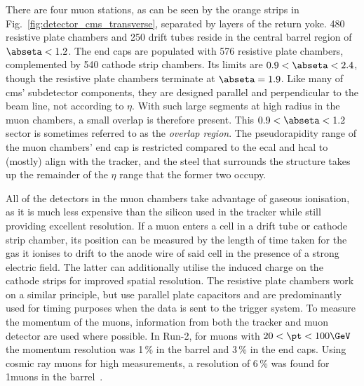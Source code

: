 There are four muon stations, as can be seen by the orange strips in Fig.~\ref{fig:detector_cms_transverse}, separated by layers of the return yoke. 480 resistive plate chambers and 250 drift tubes reside in the central barrel region of $\abseta < \text{1.2}$. The end caps are populated with 576 resistive plate chambers, complemented by 540 cathode strip chambers. Its limits are $\text{0.9} < \abseta < \text{2.4}$, though the resistive plate chambers terminate at $\abseta = \text{1.9}$. Like many of \acrshort{cms}' subdetector components, they are designed parallel and perpendicular to the beam line, not according to $\eta$. With such large segments at high radius in the muon chambers, a small overlap is therefore present. This $\text{0.9} < \abseta < \text{1.2}$ sector is sometimes referred to as the \emph{overlap region}. The pseudorapidity range of the muon chambers' end cap is restricted compared to the \acrshort{ecal} and \acrshort{hcal} to (mostly) align with the tracker, and the steel that surrounds the structure takes up the remainder of the $\eta$ range that the former two occupy.

All of the detectors in the muon chambers take advantage of gaseous ionisation, as it is much less expensive than the silicon used in the tracker while still providing excellent resolution. If a muon enters a cell in a drift tube or cathode strip chamber, its position can be measured by the length of time taken for the gas it ionises to drift to the anode wire of said cell in the presence of a strong electric field. The latter can additionally utilise the induced charge on the cathode strips for improved spatial resolution. The resistive plate chambers work on a similar principle, but use parallel plate capacitors and are predominantly used for timing purposes when the data is sent to the trigger system. To measure the momentum of the muons, information from both the tracker and muon detector are used where possible. In Run-2, for muons with $\text{20} < \pt < \text{100}\GeV$ the momentum resolution was 1\,\% in the barrel and 3\,\% in the end caps. Using cosmic ray muons for high \pt measurements, a resolution of 6\,\% was found for 1\TeV muons in the barrel~\cite{muon_detector_perf_2018}.

